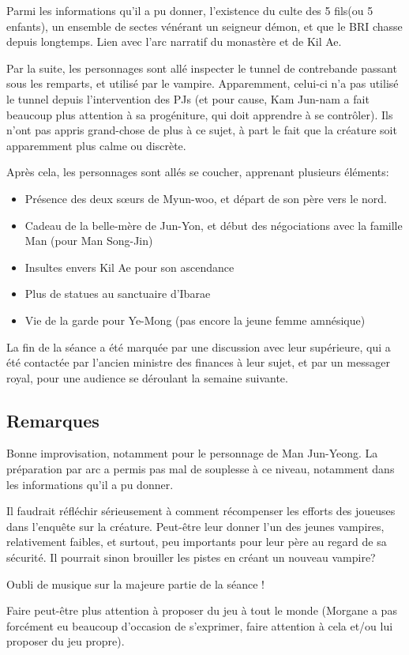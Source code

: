 \documentclass[10pt,a4paper]{book}
\begin{document}
Parmi les informations qu'il a pu donner, l'existence du culte des 5 fils(ou 5 enfants), un ensemble de sectes vénérant un seigneur démon, et que le BRI chasse depuis longtemps. Lien avec l'arc narratif du monastère et de Kil Ae.

Par la suite, les personnages sont allé inspecter le tunnel de contrebande passant sous les remparts, et utilisé par le vampire. Apparemment, celui-ci n'a pas utilisé le tunnel depuis l'intervention des PJs (et pour cause, Kam Jun-nam a fait beaucoup plus attention à sa progéniture, qui doit apprendre à se contrôler). Ils n'ont pas appris grand-chose de plus à ce sujet, à part le fait que la créature soit apparemment plus calme ou discrète.

Après cela, les personnages sont allés se coucher, apprenant plusieurs éléments:
\begin{itemize}
\item Présence des deux sœurs de Myun-woo, et départ de son père vers le nord.
\item Cadeau de la belle-mère de Jun-Yon, et début des négociations avec la famille Man (pour Man Song-Jin)
\item Insultes envers Kil Ae pour son ascendance
\item Plus de statues au sanctuaire d'Ibarae
\item Vie de la garde pour Ye-Mong (pas encore la jeune femme amnésique)
\end{itemize}
La fin de la séance a été marquée par une discussion avec leur supérieure, qui a été contactée par l'ancien ministre des finances à leur sujet, et par un messager royal, pour une audience se déroulant la semaine suivante.
\subsection{Remarques}
Bonne improvisation, notamment pour le personnage de Man Jun-Yeong. La préparation par arc a permis pas mal de souplesse à ce niveau, notamment dans les informations qu'il a pu donner.

Il faudrait réfléchir sérieusement à comment récompenser les efforts des joueuses dans l'enquête sur la créature. Peut-être leur donner l'un des jeunes vampires, relativement faibles, et surtout, peu importants pour leur père au regard de sa sécurité. Il pourrait sinon brouiller les pistes en créant un nouveau vampire?

Oubli de musique sur la majeure partie de la séance !

Faire peut-être plus attention à proposer du jeu à tout le monde (Morgane a pas forcément eu beaucoup d'occasion de s'exprimer, faire attention à cela et/ou lui proposer du jeu propre).
\end{document}
